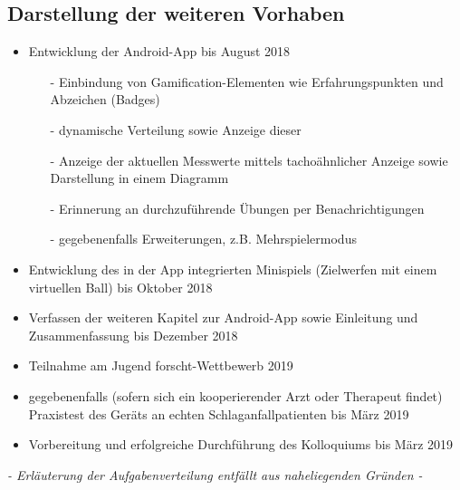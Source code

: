 \documentclass[a4paper, 11pt, landscape]{scrartcl}
\begin{document}
\begin{multicols*}{2}
\section{Darstellung der weiteren Vorhaben}
\begin{itemize}
\item Entwicklung der Android-App bis August 2018
\begin{itemize}
\item[-] Einbindung von Gamification-Elementen wie Erfahrungspunkten und Abzeichen (Badges)
\item[-] dynamische Verteilung sowie Anzeige dieser
\item[-] Anzeige der aktuellen Messwerte mittels tachoähnlicher Anzeige sowie Darstellung in einem Diagramm
\item[-] Erinnerung an durchzuführende Übungen per Benachrichtigungen
\item[-] gegebenenfalls Erweiterungen, z.B. Mehrspielermodus
\end{itemize}
\item Entwicklung des in der App integrierten Minispiels (Zielwerfen mit einem virtuellen Ball) bis Oktober 2018
\item Verfassen der weiteren Kapitel zur Android-App sowie Einleitung und Zusammenfassung bis Dezember 2018
\item Teilnahme am \glqq Jugend forscht\grqq -Wettbewerb 2019
\item gegebenenfalls (sofern sich ein kooperierender Arzt oder Therapeut findet) Praxistest des Geräts an echten Schlaganfallpatienten bis März 2019
\item Vorbereitung und erfolgreiche Durchführung des Kolloquiums bis März 2019
\end{itemize}
\emph{- Erläuterung der Aufgabenverteilung entfällt aus naheliegenden Gründen -}

\end{multicols*}
\end{document}
